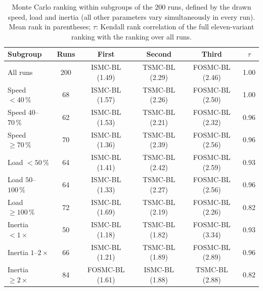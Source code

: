 \begin{table}[!t]
\centering
\caption{Monte Carlo ranking within subgroups of the 200 runs, defined by the drawn speed, load and inertia (all other parameters vary simultaneously in every run). Mean rank in parentheses; $\tau$: Kendall rank correlation of the full eleven-variant ranking with the ranking over all runs.}
\label{tab:subgroups}
\small
\begin{tabular}{@{}lccccc@{}}
\toprule
\textbf{Subgroup} & \textbf{Runs} & \textbf{First} & \textbf{Second} & \textbf{Third} & $\tau$ \\
\midrule
All runs & 200 & ISMC-BL (1.49) & TSMC-BL (2.29) & FOSMC-BL (2.46) & 1.00 \\
Speed $<40\,\%$ & 68 & ISMC-BL (1.57) & TSMC-BL (2.26) & FOSMC-BL (2.50) & 1.00 \\
Speed $40$--$70\,\%$ & 62 & ISMC-BL (1.53) & TSMC-BL (2.21) & FOSMC-BL (2.32) & 0.96 \\
Speed $\ge70\,\%$ & 70 & ISMC-BL (1.36) & TSMC-BL (2.39) & FOSMC-BL (2.56) & 0.96 \\
Load $<50\,\%$ & 64 & ISMC-BL (1.41) & TSMC-BL (2.42) & FOSMC-BL (2.59) & 0.93 \\
Load $50$--$100\,\%$ & 64 & ISMC-BL (1.33) & TSMC-BL (2.27) & FOSMC-BL (2.56) & 0.96 \\
Load $\ge100\,\%$ & 72 & ISMC-BL (1.69) & TSMC-BL (2.19) & FOSMC-BL (2.26) & 0.82 \\
Inertia $<1\times$ & 50 & ISMC-BL (1.18) & TSMC-BL (1.82) & FOSMC-BL (3.34) & 0.93 \\
Inertia $1$--$2\times$ & 66 & ISMC-BL (1.21) & TSMC-BL (1.89) & FOSMC-BL (2.89) & 0.96 \\
Inertia $\ge2\times$ & 84 & FOSMC-BL (1.61) & ISMC-BL (1.88) & TSMC-BL (2.88) & 0.82 \\
\bottomrule
\end{tabular}
\end{table}
